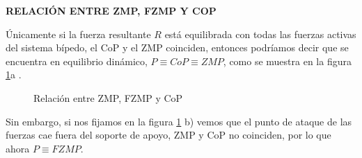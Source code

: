 \textbf{RELACIÓN ENTRE ZMP, FZMP Y COP}

Únicamente si la fuerza resultante $R$ está equilibrada con todas las fuerzas activas del sistema bípedo, el CoP y el ZMP coinciden, entonces podríamos decir que se encuentra en equilibrio dinámico, $P \equiv CoP \equiv ZMP$, como se muestra en la figura \ref{figura224}a \cite{ref24}. 

\begin{figure}[H]
\centering
{}
\quad
{}
\caption{Relación entre ZMP, FZMP y CoP}
\label{figura224}
\end{figure}

Sin embargo, si nos fijamos en la figura \ref{figura224} b) vemos que el punto de ataque de las fuerzas cae fuera del soporte de apoyo, ZMP y CoP no coinciden, por lo que ahora $P \equiv FZMP$.

\afterpage{\null\newpage}
\newpage


